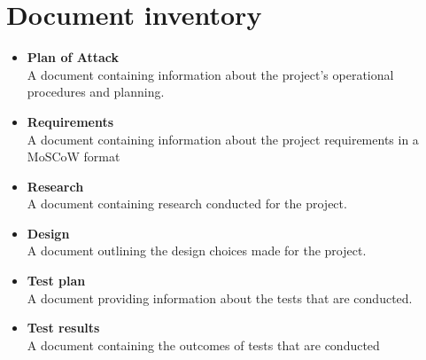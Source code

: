 \documentclass{article} %
\begin{document}
    \section{Document inventory}
    \begin{itemize}
        \item \textbf{Plan of Attack}
        \\
        A document containing information about the project's operational procedures and planning.
        \item \textbf{Requirements}
        \\
        A document containing information about the project requirements in a MoSCoW format
        \item \textbf{Research}
        \\
        A document containing research conducted for the project.
        \item \textbf {Design}
        \\
        A document outlining the design choices made for the project.
        \item \textbf {Test plan}
        \\
        A document providing information about the tests that are conducted.
        \item \textbf {Test results}
        \\
        A document containing the outcomes of tests that are conducted
    \end{itemize}

    \newpage
\end{document}
